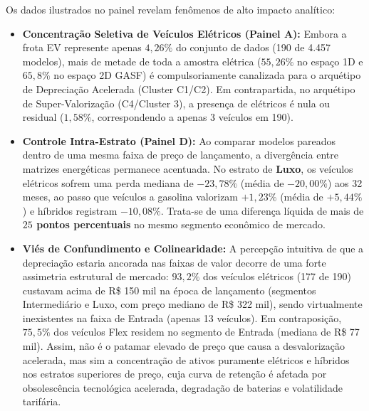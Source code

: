 Os dados ilustrados no painel revelam fenômenos de alto impacto analítico:
\begin{itemize}
    \item \textbf{Concentração Seletiva de Veículos Elétricos (Painel A):} Embora a frota EV represente apenas $4{,}26\%$ do conjunto de dados (190 de 4.457 modelos), mais de metade de toda a amostra elétrica (\textbf{$55{,}26\%$} no espaço 1D e \textbf{$65{,}8\%$} no espaço 2D GASF) é compulsoriamente canalizada para o arquétipo de Depreciação Acelerada (Cluster C1/C2). Em contrapartida, no arquétipo de Super-Valorização (C4/Cluster 3), a presença de elétricos é nula ou residual ($1{,}58\%$, correspondendo a apenas 3 veículos em 190).
    \item \textbf{Controle Intra-Estrato (Painel D):} Ao comparar modelos pareados dentro de uma mesma faixa de preço de lançamento, a divergência entre matrizes energéticas permanece acentuada. No estrato de \textbf{Luxo}, os veículos elétricos sofrem uma perda mediana de $-23{,}78\%$ (média de $-20{,}00\%$) aos 32 meses, ao passo que veículos a gasolina valorizam $+1{,}23\%$ (média de $+5{,}44\%$) e híbridos registram $-10{,}08\%$. Trata-se de uma diferença líquida de mais de \textbf{$25$ pontos percentuais} no mesmo segmento econômico de mercado.
    \item \textbf{Viés de Confundimento e Colinearidade:} A percepção intuitiva de que a depreciação estaria ancorada nas faixas de valor decorre de uma forte assimetria estrutural de mercado: $93{,}2\%$ dos veículos elétricos (177 de 190) custavam acima de R\$ 150 mil na época de lançamento (segmentos Intermediário e Luxo, com preço mediano de R\$ 322 mil), sendo virtualmente inexistentes na faixa de Entrada (apenas 13 veículos). Em contraposição, $75{,}5\%$ dos veículos Flex residem no segmento de Entrada (mediana de R\$ 77 mil). Assim, não é o patamar elevado de preço que causa a desvalorização acelerada, mas sim a concentração de ativos puramente elétricos e híbridos nos estratos superiores de preço, cuja curva de retenção é afetada por obsolescência tecnológica acelerada, degradação de baterias e volatilidade tarifária.
\end{itemize}

